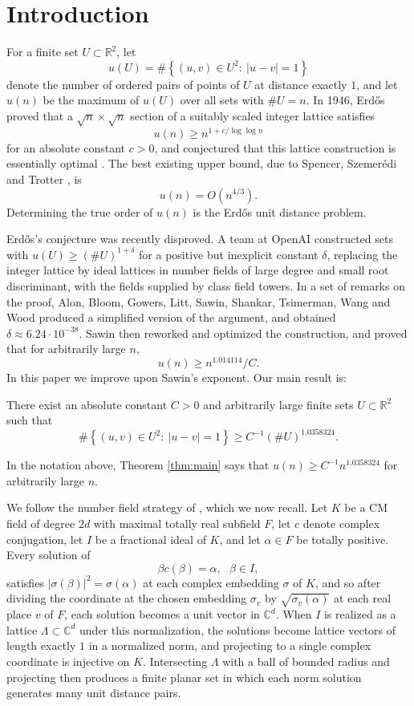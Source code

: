 \section{Introduction}

For a finite set $U\subset\mathbb{R}^{2}$, let
\[
u(U)=\#\left\{ (u,v)\in U^{2}:\ |u-v|=1\right\}
\]
denote the number of ordered pairs of points of $U$ at distance exactly
$1$, and let $u(n)$ be the maximum of $u(U)$ over all sets with $\#U=n$.
In 1946, Erd\H{o}s \cite{Erdos1946} proved that a $\sqrt{n}\times\sqrt{n}$
section of a suitably scaled integer lattice satisfies
\[
u(n)\geq n^{1+c/\log\log n}
\]
for an absolute constant $c>0$, and conjectured that this lattice
construction is essentially optimal \cite{Erdos1946,Erdos1994}. The best
existing upper bound, due to Spencer, Szemer\'edi and Trotter
\cite{SpencerSzemerediTrotter}, is
\[
u(n)=O(n^{4/3}).
\]
Determining the true order of $u(n)$ is the Erd\H{o}s unit distance
problem.

Erd\H{o}s's conjecture was recently disproved. A team at OpenAI
\cite{OpenAIUnitDistance} constructed sets with $u(U)\geq(\#U)^{1+\delta}$
for a positive but inexplicit constant $\delta$, replacing the integer
lattice by ideal lattices in number fields of large degree and small root
discriminant, with the fields supplied by class field towers. In a set of
remarks on the proof, Alon, Bloom, Gowers, Litt, Sawin, Shankar,
Tsimerman, Wang and Wood \cite{AlonEtAl} produced a simplified version
of the argument, and obtained $\delta\approx6.24\cdot10^{-38}$. Sawin
\cite{Sawin} then reworked and optimized the construction, and proved
that for arbitrarily large $n$,
\[
u(n)\geq n^{1.014114}/C.
\]
In this paper we improve upon Sawin's exponent. Our main result is:
\begin{theorem}
\label{thm:main}There exist an absolute constant $C>0$ and arbitrarily
large finite sets $U\subset\mathbb{R}^{2}$ such that
\[
\#\left\{ (u,v)\in U^{2}:\ |u-v|=1\right\} \geq C^{-1}(\#U)^{1.0358324}.
\]
\end{theorem}
\noindent In the notation above, Theorem \ref{thm:main} says that
$u(n)\geq C^{-1}n^{1.0358324}$ for arbitrarily large $n$.

We follow the number field strategy of \cite{Sawin}, which we now
recall. Let $K$ be a CM field of degree $2d$ with maximal totally real
subfield $F$, let $c$ denote complex conjugation, let $I$ be a
fractional ideal of $K$, and let $\alpha\in F$ be totally positive.
Every solution of
\[
\beta c(\beta)=\alpha,\ \ \ \beta\in I,
\]
satisfies $|\sigma(\beta)|^{2}=\sigma(\alpha)$ at each complex embedding
$\sigma$ of $K$, and so after dividing the coordinate at the chosen
embedding $\sigma_{v}$ by $\sqrt{\sigma_{v}(\alpha)}$ at each real place
$v$ of $F$, each solution becomes a unit vector in $\mathbb{C}^{d}$.
When $I$ is realized as a lattice $\Lambda\subset\mathbb{C}^{d}$ under
this normalization, the solutions become lattice vectors of length
exactly $1$ in a normalized norm, and projecting to a single complex
coordinate is injective on $K$. Intersecting $\Lambda$ with a ball of
bounded radius and projecting then produces a finite planar set in which
each norm solution generates many unit distance pairs.


